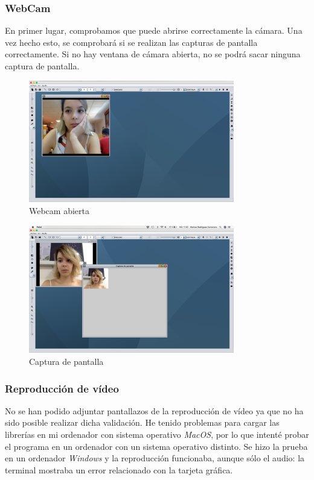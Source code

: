 \subsubsection{WebCam}
En primer lugar, comprobamos que puede abrirse correctamente la cámara. Una vez hecho esto, se comprobará si se realizan las capturas de pantalla correctamente. Si no hay ventana de cámara abierta, no se podrá sacar ninguna captura de pantalla.
\vskip0.3cm
\begin{figure}[H]
 \centering
  \includegraphics[width=0.8\textwidth]{video/webcam.jpg}
 \caption{Webcam abierta}
 \label{diseño}
 \end{figure}
 \vskip0.3cm
\begin{figure}[H]
 \centering
  \includegraphics[width=0.8\textwidth]{video/captura.jpg}
 \caption{Captura de pantalla}
 \label{diseño}
 \end{figure}
\subsubsection{Reproducción de vídeo}
No se han podido adjuntar pantallazos de la reproducción de vídeo ya que no ha sido posible realizar dicha validación. He tenido problemas para cargar las librerías en mi ordenador con sistema operativo \textit{MacOS}, por lo que intenté probar el programa en un ordenador con un sistema operativo distinto. Se hizo la prueba en un ordenador \textit{Windows} y la reproducción funcionaba, aunque sólo el audio: la terminal mostraba un error relacionado con la tarjeta gráfica.




